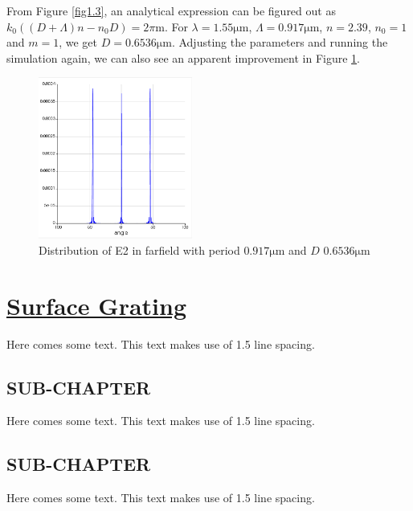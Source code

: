\documentclass[fontsize=11pt]{scrartcl}
\begin{document}
From Figure \ref{fig1.3}, an analytical expression can be figured out as
$k_{0}\left((D+\Lambda) n-n_{0} D\right)=2 \pi \mathrm{m}$. 
For $\lambda=1.55\mathrm{\mu m}$, $\Lambda=0.917\mathrm{\mu m}$, 
$n=2.39$, $n_0=1$ and $m=1$, we get $D=0.6536\mathrm{\mu m}$. 
Adjusting the parameters and running the simulation again, 
we can also see an apparent improvement in Figure \ref{fig1.6}.
\begin{figure}[H]
    \centering
     \includegraphics[width=0.45\textwidth]{img/fig1.6.png}
     \caption{Distribution of E2 in farfield with 
     period $0.917\mathrm{\mu m}$ and $D$ $0.6536\mathrm{\mu m}$}
     \label{fig1.6}
\end{figure}


\pagebreak
\section{\uline{Surface Grating}}
Here comes some text. This text makes use of 1.5 line spacing. 
\subsection{SUB-CHAPTER}
Here comes some text. This text makes use of 1.5 line spacing. 
\subsection{SUB-CHAPTER}
Here comes some text. This text makes use of 1.5 line spacing. 
\end{document}
